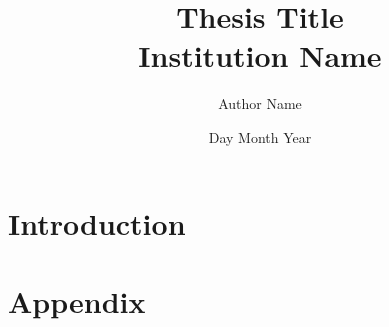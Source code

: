 \documentclass[12pt, twoside]{report}
\begin{document}
\title{
	{Thesis Title}\\
	{\large Institution Name}
}
\author{Author Name}
\date{Day Month Year}

\maketitle

\tableofcontents

\chapter{Introduction}


\appendix
\chapter{Appendix}

\end{document}

